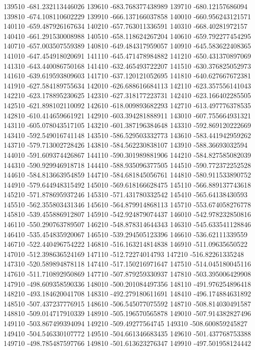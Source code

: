 {139510 -681.232113446026
139610 -683.768377438989
139710 -680.12157686094
139810 -674.108110602229
139910 -666.137166037858
140010 -660.956243121571
140110 -659.487926167634
140210 -657.763011336591
140310 -668.40281972157
140410 -661.291530008988
140510 -658.118624267204
140610 -659.792277454295
140710 -657.003507559389
140810 -649.484317959057
140910 -645.583622408365
141010 -647.454918020691
141110 -645.471478984882
141210 -650.431370897069
141310 -643.440086750168
141410 -632.465493722207
141510 -630.376825052973
141610 -639.619593809603
141710 -637.120121052695
141810 -640.627667672381
141910 -627.584189755634
142010 -626.688616684113
142110 -623.357556141043
142210 -623.178895230625
142310 -627.318177223731
142410 -623.166402285505
142510 -621.898102110092
142610 -618.009893682293
142710 -613.497776378535
142810 -610.414659661921
142910 -603.394281888911
143010 -607.755664931321
143110 -605.078043517105
143210 -601.387196384648
143310 -592.869120222669
143410 -592.549016741148
143510 -586.529503332773
143610 -583.441942959262
143710 -579.713002728426
143810 -584.562230838107
143910 -588.36693032594
144010 -591.609374426867
144110 -590.301989881906
144210 -584.827585082039
144310 -590.929946918718
144410 -588.935096377505
144510 -590.772372252528
144610 -584.813663954859
144710 -584.681845056761
144810 -580.911533890752
144910 -579.644948315492
145010 -569.618166628475
145110 -566.889137743618
145210 -571.878695937246
145310 -571.431780332542
145410 -565.64138430593
145510 -562.355803431346
145610 -564.879914868113
145710 -553.674058276778
145810 -539.455886912807
145910 -542.924879074437
146010 -542.978232850816
146110 -550.290763789507
146210 -548.878314644343
146310 -545.633541128846
146410 -535.454835920067
146510 -539.294505123396
146610 -536.62111339559
146710 -522.440496754222
146810 -516.163214814838
146910 -511.09635650522
147010 -512.398636524169
147110 -512.72274014793
147210 -516.82261335248
147310 -520.589894878118
147410 -517.150216971647
147510 -514.045180045116
147610 -511.710892950869
147710 -507.879259330937
147810 -503.395006429908
147910 -498.609358590336
148010 -500.201084497356
148110 -491.976254896418
148210 -493.184620041708
148310 -492.279180611691
148410 -496.174884631892
148510 -507.437237776915
148610 -506.545077075592
148710 -508.814030491587
148810 -509.014717910339
148910 -505.196570565878
149010 -507.914382827496
149110 -503.867499394094
149210 -509.49277564745
149310 -508.600859245827
149410 -504.546330107772
149510 -504.661346683435
149610 -501.437768753388
149710 -498.785487597766
149810 -501.613623276347
149910 -497.501958124442
}
